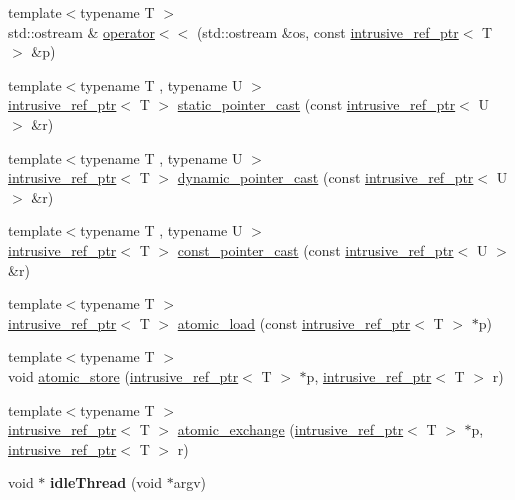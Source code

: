 \begin{DoxyCompactItemize}
\item 
{\footnotesize template$<$typename T $>$ }\\std\-::ostream \& \hyperlink{namespacemiosix_a5d47cb37376d995b724cbcefcb99613f}{operator$<$$<$} (std\-::ostream \&os, const \hyperlink{classmiosix_1_1intrusive__ref__ptr}{intrusive\-\_\-ref\-\_\-ptr}$<$ T $>$ \&p)
\item 
{\footnotesize template$<$typename T , typename U $>$ }\\\hyperlink{classmiosix_1_1intrusive__ref__ptr}{intrusive\-\_\-ref\-\_\-ptr}$<$ T $>$ \hyperlink{namespacemiosix_a85ec5629a974331836172e94aca40d3b}{static\-\_\-pointer\-\_\-cast} (const \hyperlink{classmiosix_1_1intrusive__ref__ptr}{intrusive\-\_\-ref\-\_\-ptr}$<$ U $>$ \&r)
\item 
{\footnotesize template$<$typename T , typename U $>$ }\\\hyperlink{classmiosix_1_1intrusive__ref__ptr}{intrusive\-\_\-ref\-\_\-ptr}$<$ T $>$ \hyperlink{namespacemiosix_a0975f49433b200ce0c930b68e8edbab8}{dynamic\-\_\-pointer\-\_\-cast} (const \hyperlink{classmiosix_1_1intrusive__ref__ptr}{intrusive\-\_\-ref\-\_\-ptr}$<$ U $>$ \&r)
\item 
{\footnotesize template$<$typename T , typename U $>$ }\\\hyperlink{classmiosix_1_1intrusive__ref__ptr}{intrusive\-\_\-ref\-\_\-ptr}$<$ T $>$ \hyperlink{namespacemiosix_a7430e32ec1ac61364bcea3fbb9b83932}{const\-\_\-pointer\-\_\-cast} (const \hyperlink{classmiosix_1_1intrusive__ref__ptr}{intrusive\-\_\-ref\-\_\-ptr}$<$ U $>$ \&r)
\item 
{\footnotesize template$<$typename T $>$ }\\\hyperlink{classmiosix_1_1intrusive__ref__ptr}{intrusive\-\_\-ref\-\_\-ptr}$<$ T $>$ \hyperlink{namespacemiosix_a9140dc45a2dcd16e6907d4c21438b616}{atomic\-\_\-load} (const \hyperlink{classmiosix_1_1intrusive__ref__ptr}{intrusive\-\_\-ref\-\_\-ptr}$<$ T $>$ $\ast$p)
\item 
{\footnotesize template$<$typename T $>$ }\\void \hyperlink{namespacemiosix_ad99ea00de47843c30268b0f3812f7a37}{atomic\-\_\-store} (\hyperlink{classmiosix_1_1intrusive__ref__ptr}{intrusive\-\_\-ref\-\_\-ptr}$<$ T $>$ $\ast$p, \hyperlink{classmiosix_1_1intrusive__ref__ptr}{intrusive\-\_\-ref\-\_\-ptr}$<$ T $>$ r)
\item 
{\footnotesize template$<$typename T $>$ }\\\hyperlink{classmiosix_1_1intrusive__ref__ptr}{intrusive\-\_\-ref\-\_\-ptr}$<$ T $>$ \hyperlink{namespacemiosix_a0017bf39ebf00af063c0e144e73fce1c}{atomic\-\_\-exchange} (\hyperlink{classmiosix_1_1intrusive__ref__ptr}{intrusive\-\_\-ref\-\_\-ptr}$<$ T $>$ $\ast$p, \hyperlink{classmiosix_1_1intrusive__ref__ptr}{intrusive\-\_\-ref\-\_\-ptr}$<$ T $>$ r)
\item 
\hypertarget{namespacemiosix_a82851d5db3c572c58b81eef7835f65c9}{void $\ast$ {\bfseries idle\-Thread} (void $\ast$argv)}\label{namespacemiosix_a82851d5db3c572c58b81eef7835f65c9}


\end{DoxyCompactItemize}
